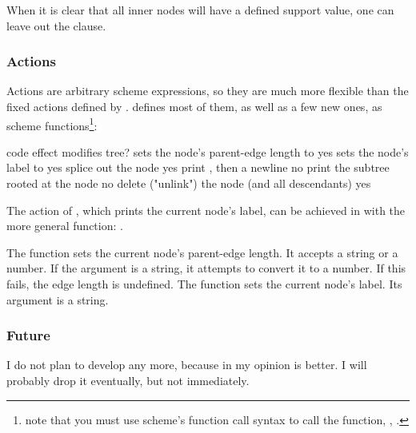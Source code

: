 When it is clear that all inner nodes will have a defined support
value, one can leave out the  clause.

\subsubsection{Actions}

Actions are arbitrary scheme expressions, so they are much more flexible than
the fixed actions defined by \ed. \sched{} defines most of them, as well as a
few new ones, as scheme functions\footnote{note that you must use scheme's function call syntax to call the function, \ie, .}:

\startalignment[center]
	\starttabulate[|c|l|c|]
		\NC code \NC effect \NC modifies tree?\NC\NR
		\HL
		\NC {}	\NC sets the node's parent-edge length to 	\NC yes \NC\NR
		\NC {}	\NC sets the node's label to 	\NC yes \NC\NR
		\NC {} 				\NC splice out the node 									\NC yes \NC\NR
		\NC {} 	\NC print , then a newline 		\NC no \NC\NR
		\NC {} 				\NC print the subtree rooted at the node 	\NC no \NC\NR
		\NC {} 				\NC delete ("unlink") the node (and all descendants) \NC yes \NC\NR
	\stoptabulate
\stopalignment

The  action of \ed{}, which prints the current node's
label, can be achieved in \sched{} with the more general  function:
.

The  function sets the current node's parent-edge length. It accepts
a string or a number. If the argument is a string, it attempts to convert it to
a number. If this fails, the edge length is undefined. The 
function sets the current node's label. Its argument is a string.

\subsubsection{Future}

I do not plan to develop \sched{} any more, because in my opinion \luaed{} is
better. I will probably drop it eventually, but not immediately.
